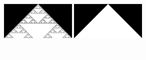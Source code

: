 \documentclass{article}
\newcommand{\todo}[1]{\colorbox{WildStrawberry}{\textcolor{white}{#1}}}
\begin{document}
\begin{figure}
    \includegraphics[width=0.32\textwidth]{ca-rules/single1/rule-182.png}\hspace{0.01\textwidth}%
    \includegraphics[width=0.32\textwidth]{ca-rules/single1/rule-222-254.png}%
    \hspace{0.01\textwidth}%
    \caption{\todo{fill caption}}
    \label{fig:supplement:ca-rules-single}
\end{figure}
\end{document}
